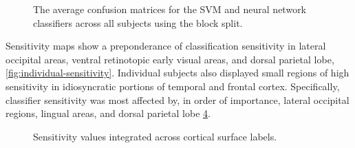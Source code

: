 \documentclass[authoryear]{elsarticle}
\begin{document}
\begin{figure}
\centering
\begin{subfigure}{0.4\textwidth}
\centering
\begin{adjustbox}{center}

\end{adjustbox}
\caption{}
\label{fig:average-confusion-svm}
\end{subfigure}

\begin{subfigure}{0.4\textwidth}
\centering
\begin{adjustbox}{center}

\end{adjustbox}
\caption{}
\label{fig:average-confusion-nn}
\end{subfigure}
\caption{The average confusion matrices for the  SVM and  neural network classifiers across all subjects using the block split.}
\label{fig:average-confusion}
\end{figure}

Sensitivity maps show a preponderance of classification sensitivity in lateral occipital areas, ventral retinotopic early visual areas, and dorsal parietal lobe, \ref{fig:individual-sensitivity}. 
Individual subjects also displayed small regions of high sensitivity in idiosyncratic portions of temporal and frontal cortex. 
Specifically, classifier sensitivity was most affected by, in order of importance, lateral occipital regions, lingual areas, and dorsal parietal lobe  \ref{tab:full-sensitivity}. 

\begin{figure}
\centering
\begin{adjustbox}{center}

\end{adjustbox}
\caption{Sensitivity values integrated across cortical surface labels.}
\label{tab:full-sensitivity}
\end{figure}
\end{document}
